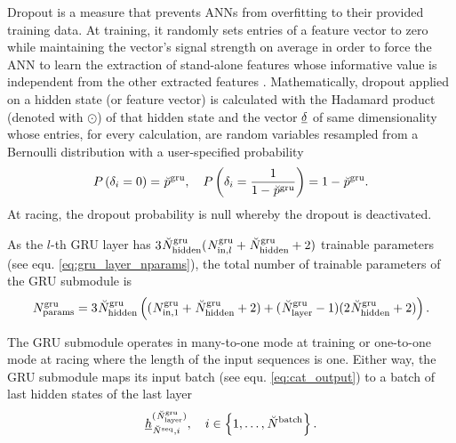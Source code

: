 Dropout is a measure that prevents ANNs from overfitting 
to their provided training data.
At training, 
it randomly sets entries of a feature vector to zero 
while maintaining the vector's signal strength on average
in order to force the ANN to learn the extraction of stand-alone features 
whose informative value is independent from the other extracted features \cite{Hinton2012}.
Mathematically, dropout applied on a hidden state (or feature vector)
is calculated with the Hadamard product (denoted with $\odot$)
of that hidden state and the vector $\GRUDropout$ of same dimensionality 
whose entries, for every calculation, 
are random variables resampled 
from a Bernoulli distribution
with a user-specified probability
\begin{equation}
    P \left( \delta_i = 0 \right) = \GRUDropoutP
    ,\quad
    P \left( \delta_i = \frac{1}{1-\GRUDropoutP} \right) = 1 - \GRUDropoutP
    .
\end{equation}
At racing, the dropout probability is null
whereby the dropout is deactivated.

As the $l$-th GRU layer has $3\GRUHiddenSize (\GRUInp{l} + \GRUHiddenSize + 2)$
trainable parameters (see equ. \ref{eq:gru_layer_nparams}),
the total number of trainable parameters of the GRU submodule is
\begin{align} \label{eq:gru_param}
    \GRUNumP = 3\GRUHiddenSize \tuple{
        (\GRUInp{1} + \GRUHiddenSize + 2)
        + 
        (\GRUNumLayer -1)
        (2\GRUHiddenSize + 2)
    }.
\end{align}

The GRU submodule operates in many-to-one mode at training or 
one-to-one mode at racing where the length of the input sequences is one.
Either way, the GRU submodule maps its input batch
(see equ. \ref{eq:cat_output})
to a batch of last hidden states of the last layer
\begin{equation}
    \hiddenstate[]{(\GRUNumLayer)}{\seqLen, i}{}{}
    , \quad i \in \setOfInts{1, \dots, \batchSize}
    .
\end{equation}




\newcommand{\normDesSpeed}{\speed[\norm]{\drone}{\desired}{}{}}
\newcommand{\waypIRS}{\pos[]{\wayp}{}{\irs}{}}
\newcommand{\headNavDec}{(\normDesSpeed, \waypIRS)}

\newcommand{\desAngVel}{\angvel[]{\drone}{\desired}{\lrs}{}}
\newcommand{\desAngAcc}{\angvel[\dot]{\drone}{\desired}{\lrs}{}}
\newcommand{\desColThrust}{\anything[]{\drone}{\desired}{}{}{c}}
\newcommand{\headCtrlCmd}{(\desAngVel, \desAngAcc, \desColThrust)}

